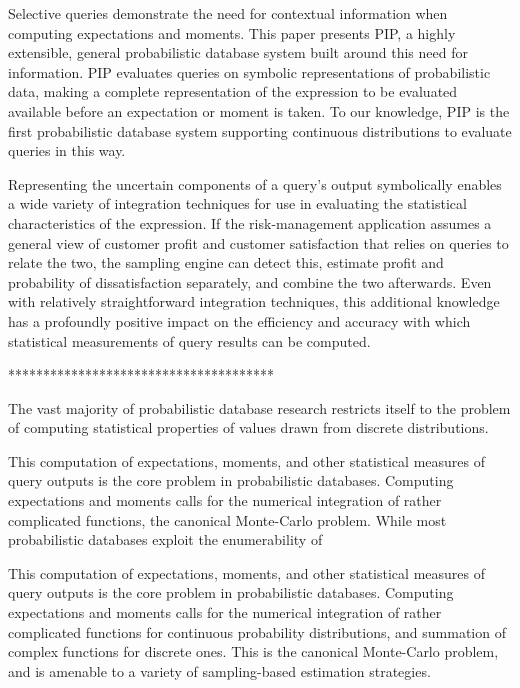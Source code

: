 Selective queries demonstrate the need for contextual information when computing expectations and moments.  This paper presents PIP, a highly extensible, general probabilistic database system built around this need for information.  PIP evaluates queries on symbolic representations of probabilistic data, making a complete representation of the expression to be evaluated available before an expectation or moment is taken.  To our knowledge, PIP is the first probabilistic database system supporting continuous distributions to evaluate queries in this way.

Representing the uncertain components of a query's output symbolically enables a wide variety of integration techniques for use in evaluating the statistical characteristics of the expression.  If the risk-management application assumes a general view of customer profit and customer satisfaction that relies on queries to relate the two, the sampling engine can detect this, estimate profit and probability of dissatisfaction separately, and combine the two afterwards.  Even with relatively straightforward integration techniques, this additional knowledge has a profoundly positive impact on the efficiency and accuracy with which statistical measurements of query results can be computed.




**************************************



The vast majority of probabilistic database research restricts itself to the problem of computing statistical properties of values drawn from discrete distributions.


This computation of expectations, moments, and other statistical measures of query outputs is the core problem in probabilistic databases.  Computing expectations and moments calls for the numerical integration of rather complicated functions, the canonical Monte-Carlo \cite{montecarlo} problem.  While most probabilistic databases exploit the enumerability of 


This computation of expectations, moments, and other statistical measures of query outputs is the core problem in probabilistic databases.  Computing expectations and moments calls for the numerical integration of rather complicated functions for continuous probability distributions, and summation of complex functions for discrete ones.  This is the canonical Monte-Carlo \cite{montecarlo} problem, and is amenable to a variety of sampling-based estimation strategies.  

